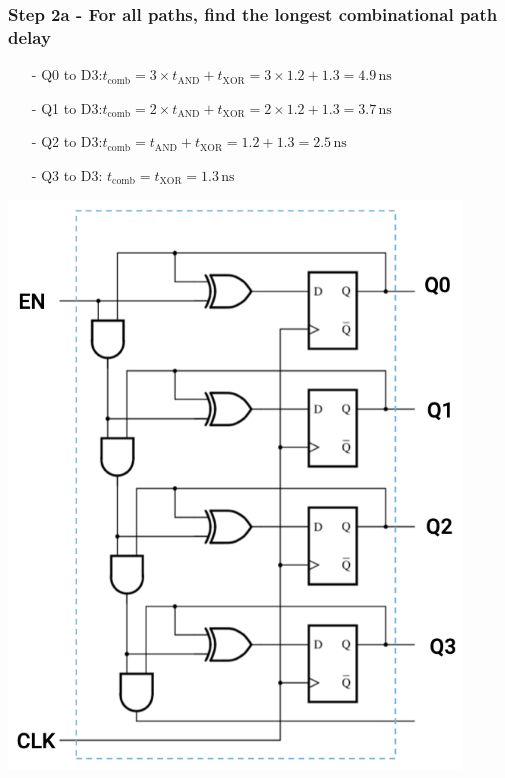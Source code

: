 \documentclass[12pt,openany]{book}
\begin{document}
\subsubsection*{Step 2a - For all paths, find the longest combinational path delay}
\begin{minipage}[htp]{0.45\textwidth}
\begin{itemize}
    \item[-] Q0 to D3:\newline \( t_{\text{comb}} = 3 \times t_{\text{AND}} + t_{\text{XOR}} = 3 \times 1.2 + 1.3 = 4.9 \, \text{ns} \)
    \item[-] Q1 to D3:\newline \( t_{\text{comb}} = 2 \times t_{\text{AND}} + t_{\text{XOR}} = 2 \times 1.2 + 1.3 = 3.7 \, \text{ns} \)
    \item[-] Q2 to D3:\newline \( t_{\text{comb}} = t_{\text{AND}} + t_{\text{XOR}} = 1.2 + 1.3 = 2.5 \, \text{ns} \)
    \item[-] Q3 to D3: \newline \( t_{\text{comb}} = t_{\text{XOR}} = 1.3 \, \text{ns} \)
\end{itemize}
\end{minipage}%
\hfill
\vline
\hfill
\begin{minipage}[htp]{0.45\textwidth}
		\includegraphics[width=0.9\textwidth]{circuits/15.7.5.png}
\end{minipage}
\end{document}
